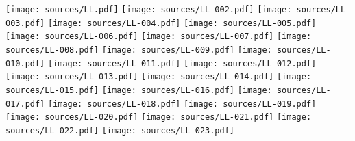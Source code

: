   \texttt{[image: sources/LL.pdf]}
  \texttt{[image: sources/LL-002.pdf]}
  \texttt{[image: sources/LL-003.pdf]}
  \texttt{[image: sources/LL-004.pdf]}
  \texttt{[image: sources/LL-005.pdf]}
  \texttt{[image: sources/LL-006.pdf]}
  \texttt{[image: sources/LL-007.pdf]}
  \texttt{[image: sources/LL-008.pdf]}
  \texttt{[image: sources/LL-009.pdf]}
  \texttt{[image: sources/LL-010.pdf]}
  \texttt{[image: sources/LL-011.pdf]}
  \texttt{[image: sources/LL-012.pdf]}
  \texttt{[image: sources/LL-013.pdf]}
  \texttt{[image: sources/LL-014.pdf]}
  \texttt{[image: sources/LL-015.pdf]}
  \texttt{[image: sources/LL-016.pdf]}
  \texttt{[image: sources/LL-017.pdf]}
  \texttt{[image: sources/LL-018.pdf]}
  \texttt{[image: sources/LL-019.pdf]}
  \texttt{[image: sources/LL-020.pdf]}
  \texttt{[image: sources/LL-021.pdf]}
  \texttt{[image: sources/LL-022.pdf]}
  \texttt{[image: sources/LL-023.pdf]}


